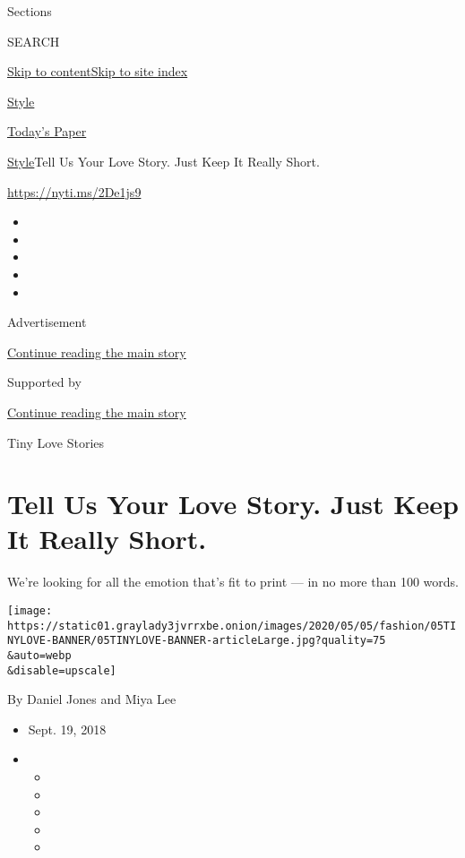 Sections

SEARCH

\protect\hyperlink{site-content}{Skip to
content}\protect\hyperlink{site-index}{Skip to site index}

\href{https://www.nytimes3xbfgragh.onion/section/style}{Style}

\href{https://myaccount.nytimes3xbfgragh.onion/auth/login?response_type=cookie\&client_id=vi}{}

\href{https://www.nytimes3xbfgragh.onion/section/todayspaper}{Today's
Paper}

\href{/section/style}{Style}\textbar{}Tell Us Your Love Story. Just Keep
It Really Short.

\url{https://nyti.ms/2De1js9}

\begin{itemize}
\item
\item
\item
\item
\item
\end{itemize}

Advertisement

\protect\hyperlink{after-top}{Continue reading the main story}

Supported by

\protect\hyperlink{after-sponsor}{Continue reading the main story}

Tiny Love Stories

\hypertarget{tell-us-your-love-story-just-keep-it-really-short}{%
\section{Tell Us Your Love Story. Just Keep It Really
Short.}\label{tell-us-your-love-story-just-keep-it-really-short}}

We're looking for all the emotion that's fit to print --- in no more
than 100 words.

\texttt{[image: https://static01.graylady3jvrrxbe.onion/images/2020/05/05/fashion/05TINYLOVE-BANNER/05TINYLOVE-BANNER-articleLarge.jpg?quality=75\\\&auto=webp\\\&disable=upscale]}

By Daniel Jones and Miya Lee

\begin{itemize}
\item
  Sept. 19, 2018
\item
  \begin{itemize}
  \item
  \item
  \item
  \item
  \item
  \end{itemize}
\end{itemize}

